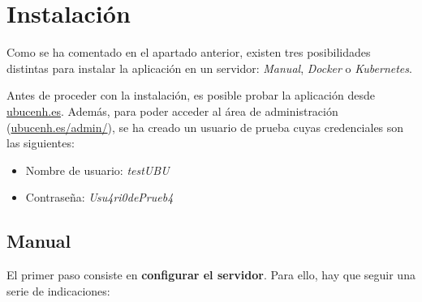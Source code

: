 \section{Instalación}

Como se ha comentado en el apartado anterior, existen tres posibilidades
distintas para instalar la aplicación en un servidor: \emph{Manual},
\emph{Docker} o \emph{Kubernetes}.

Antes de proceder con la instalación, es posible probar la aplicación desde \url{ubucenh.es}.
Además, para poder acceder al área de administración (\url{ubucenh.es/admin/}), 
se ha creado un usuario de prueba cuyas credenciales son las siguientes:

\begin{itemize}
\tightlist
\item
  Nombre de usuario: \emph{testUBU}
\item 
  Contraseña: \emph{Usu4ri0dePrueb4}
\end{itemize} 

\subsection{Manual}
El primer paso consiste en \textbf{configurar el servidor}. Para ello,
hay que seguir una serie de indicaciones:


